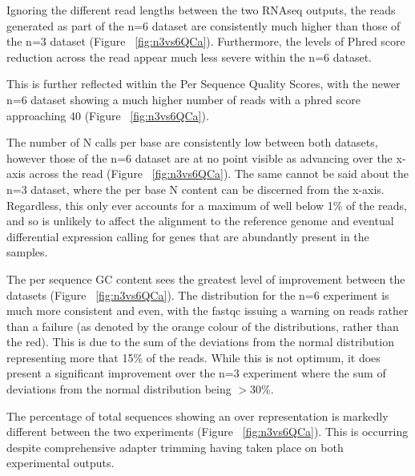 Ignoring the different read lengths between the two RNAseq outputs, the reads generated as part of the n=6 dataset are consistently much higher than those of the n=3 dataset (Figure ~\ref{fig:n3vs6QCa}). Furthermore, the levels of Phred score reduction across the read appear much less severe within the n=6 dataset. 

This is further reflected within the Per Sequence Quality Scores, with the newer n=6 dataset showing a much higher number of reads with a phred score approaching 40 (Figure ~\ref{fig:n3vs6QCa}).

The number of N calls per base are consistently low between both datasets, however those of the n=6 dataset are at no point visible as advancing over the x-axis across the read (Figure ~\ref{fig:n3vs6QCa}). The same cannot be said about the n=3 dataset, where the per base N content can be discerned from the x-axis. Regardless, this only ever accounts for a maximum of well below 1\% of the reads, and so is unlikely to affect the alignment to the reference genome and eventual differential expression calling for genes that are abundantly present in the samples. 

The per sequence GC content sees the greatest level of improvement between the datasets (Figure ~\ref{fig:n3vs6QCa}). The distribution for the n=6 experiment is much more consistent and even, with the fastqc issuing a warning on reads rather than a failure (as denoted by the orange colour of the distributions, rather than the red). This is due to the sum of the deviations from the normal distribution representing more that 15\% of the reads. While this is not optimum, it does present a significant improvement over the n=3 experiment where the sum of deviations from the normal distribution being $>$30\%.

The percentage of total sequences showing an over representation is markedly different between the two experiments (Figure ~\ref{fig:n3vs6QCa}). This is occurring despite comprehensive adapter trimming having taken place on both experimental outputs.


